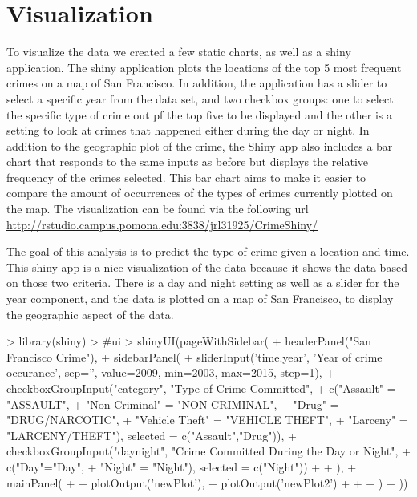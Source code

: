 \documentclass[11pt]{article}
\begin{document}
\section*{Visualization}

To visualize the data we created a few static charts, as well as a shiny application. The shiny application plots the locations of the top 5 most frequent crimes on a map of San Francisco. In addition, the application has a slider to select a specific year from the data set, and two checkbox groups: one to select the specific type of crime out pf the top five to be displayed and the other is a setting to look at crimes that happened either during the day or night. In addition to the geographic plot of the crime, the Shiny app also includes a bar chart that responds to the same inputs as before but displays the relative frequency of the crimes selected. This bar chart aims to make it easier to compare the amount of occurrences of the types of crimes currently plotted on the map. The visualization can be found via the following url \url{http://rstudio.campus.pomona.edu:3838/jrl31925/CrimeShiny/}
 

The goal of this analysis is to predict the type of crime given a location and time. This shiny app is a nice visualization of the data because it shows the data based on those two criteria. There is a day and night setting as well as a slider for the year component, and the data is plotted on a map of San Francisco, to display the geographic aspect of the data. 

\begin{Schunk}
\begin{Sinput}
> library(shiny)
> #ui
> shinyUI(pageWithSidebar(
+   headerPanel("San Francisco Crime"),
+   sidebarPanel(
+     sliderInput('time.year', 'Year of crime occurance', sep='', value=2009, min=2003, max=2015, step=1),
+     checkboxGroupInput("category", "Type of Crime Committed",
+                        c("Assault" = "ASSAULT",
+                          "Non Criminal" = "NON-CRIMINAL",
+                          "Drug" = "DRUG/NARCOTIC",
+                          "Vehicle Theft" = "VEHICLE THEFT",
+                          "Larceny" = "LARCENY/THEFT"), selected = c("Assault","Drug")),
+     checkboxGroupInput("daynight", "Crime Committed During the Day or Night",
+                        c("Day"="Day",
+                          "Night" = "Night"), selected = c("Night"))
+     
+   ),
+   mainPanel(
+     
+     plotOutput('newPlot'),
+     plotOutput('newPlot2')
+     
+     
+   )
+ ))
\end{Sinput}
\end{Schunk}
\end{document}
